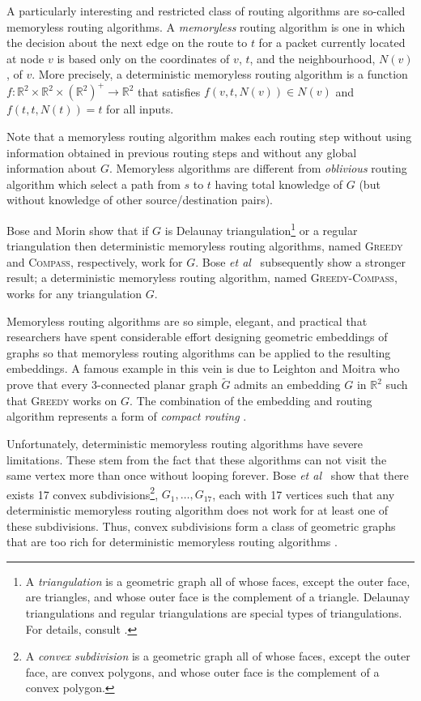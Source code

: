 \documentclass [letterpaper] {patmorin}
\newcommand{\R}{\mathbb{R}}
\newcommand{\etal}{\emph{et al}}
\begin{document}
A particularly interesting and restricted class of routing algorithms are so-called memoryless routing algorithms.  A \emph{memoryless} routing algorithm is one in which the decision about the next edge on the route to $t$ for a packet currently located at node $v$ is based only on the coordinates of $v$, $t$, and the neighbourhood, $N(v)$, of $v$. More precisely, a deterministic memoryless routing algorithm is a function $f:\R^2\times\R^2\times(\R^2)^+\rightarrow \R^2$ that satisfies $f(v,t,N(v)) \in N(v)$ and $f(t,t,N(t)) = t$ for all inputs.

Note that a memoryless routing algorithm makes each routing step without using information obtained in previous routing steps and without any global information about $G$.  Memoryless algorithms are different from \emph{oblivious} routing algorithm \cite[Section~4.2]{mr95} which select a path from $s$ to $t$ having total knowledge of $G$ (but without knowledge of other source/destination pairs).
 
Bose and Morin \cite{bose04} show that if $G$ is Delaunay triangulation\footnote{A \emph{triangulation} is a geometric graph all of whose faces, except the outer face, are triangles, and whose outer face is the complement of a triangle. Delaunay triangulations and regular triangulations are special types of triangulations. For details, consult \cite{obs92}.} or a regular triangulation then deterministic memoryless routing algorithms, named \textsc{Greedy} and \textsc{Compass}, respectively, work for $G$. Bose \etal\ \cite{bose02} subsequently show a stronger result; a deterministic memoryless routing algorithm, named \textsc{Greedy-Compass}, works for any triangulation $G$.

Memoryless routing algorithms are so simple, elegant, and practical that researchers have spent considerable effort designing geometric embeddings of graphs so that memoryless routing algorithms can be applied to the resulting embeddings.  A famous example in this vein is due to Leighton and Moitra \cite{lm08} who prove that every 3-connected planar graph $\tilde G$ admits an embedding $G$ in $\R^2$ such that \textsc{Greedy} works on $G$.  The combination of the embedding and routing algorithm represents a form of \emph{compact routing} \cite{l94}.

Unfortunately, deterministic memoryless routing algorithms have severe limitations.  These stem from the fact that these algorithms can not visit the same vertex more than once without looping forever.  Bose \etal\ \cite[Theorem~2]{bose04} show that there exists 17 convex subdivisions\footnote{A \emph{convex subdivision} is a geometric graph all of whose faces, except the outer face, are convex polygons, and whose outer face is the complement of a convex polygon.}, $G_1,\ldots,G_{17}$, each with 17 vertices such that any deterministic memoryless routing algorithm does not work for at least one of these subdivisions.  Thus, convex subdivisions form a class of geometric graphs that are too rich for deterministic memoryless routing algorithms \cite{bose02}.
\end{document}
